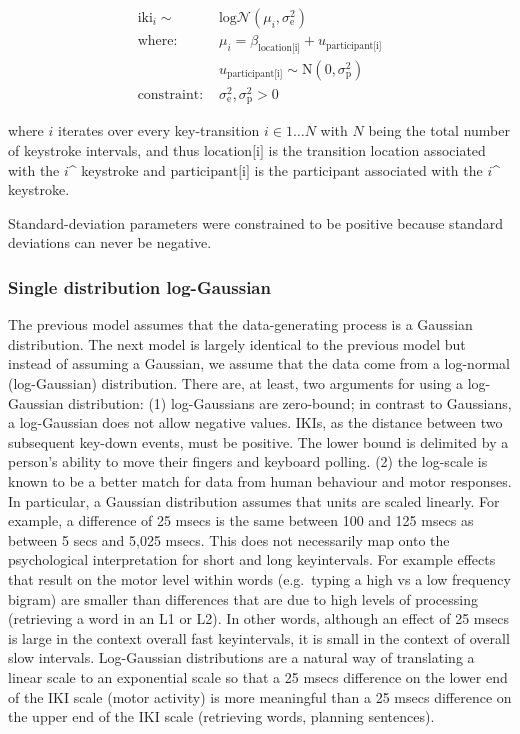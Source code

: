 \documentclass[
  man,floatsintext]{apa7}
\begin{document}
\begin{equation}
\begin{aligned}
\label{eq:unimodgaus}
\text{iki}_i \sim\text{ } & \text{log}\mathcal{N}(\mu_i, \sigma_\text{e}^2)\\
\text{where: } & \mu_i = \beta_\text{location[i]} + u_\text{participant[i]}\\
& u_\text{participant[i]} \sim \text{N}(0, \sigma_\text{p}^2)\\
\text{constraint: } & \sigma_\text{e}^2, \sigma_\text{p}^2>0
\end{aligned}
\end{equation}

where \(i\) iterates over every key-transition \(i \in 1 \dots N\) with \(N\) being the total number of keystroke intervals, and thus \(\text{location[i]}\) is the transition location associated with the \(i\)\^{} keystroke and \(\text{participant[i]}\) is the participant associated with the \(i\)\^{} keystroke.

Standard-deviation parameters were constrained to be positive because standard deviations can never be negative.

\hypertarget{single-distribution-log-gaussian}{%
\subsubsection{Single distribution log-Gaussian}\label{single-distribution-log-gaussian}}

The previous model assumes that the data-generating process is a Gaussian distribution. The next model is largely identical to the previous model but instead of assuming a Gaussian, we assume that the data come from a log-normal (log-Gaussian) distribution. There are, at least, two arguments for using a log-Gaussian distribution: (1) log-Gaussians are zero-bound; in contrast to Gaussians, a log-Gaussian does not allow negative values. IKIs, as the distance between two subsequent key-down events, must be positive. The lower bound is delimited by a person's ability to move their fingers and keyboard polling. (2) the log-scale is known to be a better match for data from human behaviour and motor responses. In particular, a Gaussian distribution assumes that units are scaled linearly. For example, a difference of 25 msecs is the same between 100 and 125 msecs as between 5 secs and 5,025 msecs. This does not necessarily map onto the psychological interpretation for short and long keyintervals. For example effects that result on the motor level within words (e.g.~typing a high vs a low frequency bigram) are smaller than differences that are due to high levels of processing (retrieving a word in an L1 or L2). In other words, although an effect of 25 msecs is large in the context overall fast keyintervals, it is small in the context of overall slow intervals. Log-Gaussian distributions are a natural way of translating a linear scale to an exponential scale so that a 25 msecs difference on the lower end of the IKI scale (motor activity) is more meaningful than a 25 msecs difference on the upper end of the IKI scale (retrieving words, planning sentences).
\end{document}
